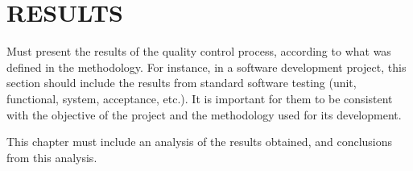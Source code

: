 \chapter{RESULTS}

Must present the results of the quality control process, according to what was defined in the methodology. For instance, in a software development project, this section should include the results from standard software testing (unit, functional, system, acceptance, etc.). It is important for them to be consistent with the objective of the project and the methodology used for its development.

This chapter must include an analysis of the results obtained, and conclusions from this analysis.
